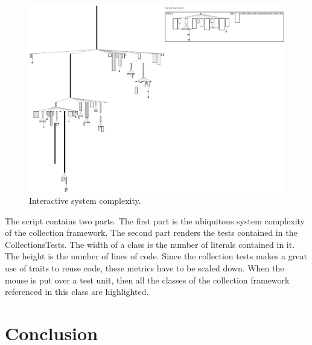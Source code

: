 \documentclass[a4paper,10pt,twoside]{book}
\begin{document}
\begin{figure}[htbp]
\centerline{\includegraphics[width=\linewidth]{testCoverage.png}}
\caption{Interactive system complexity.}
\label{fig:interactiveTestCoverage}
\end{figure}


The script contains two parts. The first part is the ubiquitous system complexity of the collection framework.  The second part renders the tests contained in the CollectionsTests. The width of a class is the number of literals contained in it. The height is the number of lines of code. Since the collection tests makes a great use of traits to reuse code, these metrics have to be scaled down. When the mouse is put over a test unit, then all the classes of the collection framework referenced in this class are highlighted. 

%


\section{Conclusion}
\end{document}
